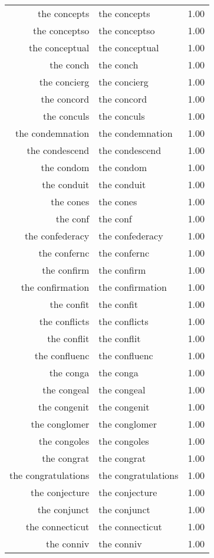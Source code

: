 \begin{table}[ht]
\begin{tabular}{rlr}
  the concepts & the concepts & 1.00 \\ 
  the conceptso & the conceptso & 1.00 \\ 
  the conceptual & the conceptual & 1.00 \\ 
  the conch & the conch & 1.00 \\ 
  the concierg & the concierg & 1.00 \\ 
  the concord & the concord & 1.00 \\ 
  the conculs & the conculs & 1.00 \\ 
  the condemnation & the condemnation & 1.00 \\ 
  the condescend & the condescend & 1.00 \\ 
  the condom & the condom & 1.00 \\ 
  the conduit & the conduit & 1.00 \\ 
  the cones & the cones & 1.00 \\ 
  the conf & the conf & 1.00 \\ 
  the confederacy & the confederacy & 1.00 \\ 
  the confernc & the confernc & 1.00 \\ 
  the confirm & the confirm & 1.00 \\ 
  the confirmation & the confirmation & 1.00 \\ 
  the confit & the confit & 1.00 \\ 
  the conflicts & the conflicts & 1.00 \\ 
  the conflit & the conflit & 1.00 \\ 
  the confluenc & the confluenc & 1.00 \\ 
  the conga & the conga & 1.00 \\ 
  the congeal & the congeal & 1.00 \\ 
  the congenit & the congenit & 1.00 \\ 
  the conglomer & the conglomer & 1.00 \\ 
  the congoles & the congoles & 1.00 \\ 
  the congrat & the congrat & 1.00 \\ 
  the congratulations & the congratulations & 1.00 \\ 
  the conjecture & the conjecture & 1.00 \\ 
  the conjunct & the conjunct & 1.00 \\ 
  the connecticut & the connecticut & 1.00 \\ 
  the conniv & the conniv & 1.00 \\ 

\end{tabular}
\end{table}
